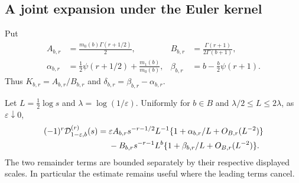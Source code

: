 \subsection{A joint expansion under the Euler kernel}

Put
\begin{align}
 A_{b,r}&=\frac{m_0(b)\Gamma(r+1/2)}2,
 & B_{b,r}&=\frac{\Gamma(r+1)}{2\Gamma(b+1)},
 \label{eutrans:eq:AB}\\
 \alpha_{b,r}&=\frac12\psi(r+1/2)+\frac{m_1(b)}{m_0(b)},
 & \beta_{b,r}&=b-\frac b2\psi(r+1).
 \label{eutrans:eq:alphabeta}
\end{align}
Thus $K_{b,r}=A_{b,r}/B_{b,r}$ and
$\delta_{b,r}=\beta_{b,r}-\alpha_{b,r}$.

\begin{lemma}
\label{eutrans:lem:joint}
Let $L=\tfrac12\log s$ and $\lambda=\log(1/\varepsilon)$. Uniformly
for $b\in B$ and $\lambda/2\leq L\leq2\lambda$, as
$\varepsilon\downarrow0$,
\begin{align}
 (-1)^r\mathcal D_{1-\varepsilon,b}^{(r)}(s)
 ={}&\varepsilon A_{b,r}s^{-r-1/2}L^{-1}
       \{1+\alpha_{b,r}/L+O_{B,r}(L^{-2})\}\notag\\
 &-B_{b,r}s^{-r-1}L^b
       \{1+\beta_{b,r}/L+O_{B,r}(L^{-2})\}.
 \label{eutrans:eq:joint}
\end{align}
The two remainder terms are bounded separately by their respective
displayed scales. In particular the estimate remains useful where
the leading terms cancel.
\end{lemma}

